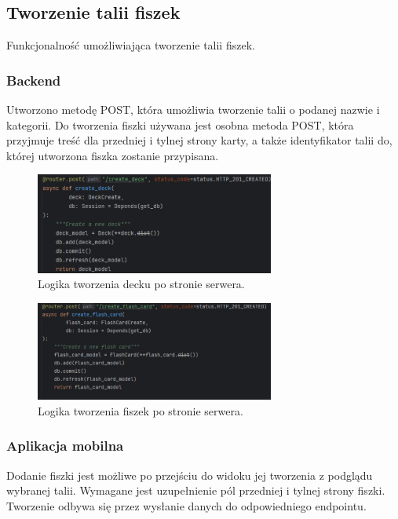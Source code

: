 \subsection{Tworzenie talii fiszek}

Funkcjonalność umożliwiająca tworzenie talii fiszek.

\subsubsection{Backend}

Utworzono metodę POST, która umożliwia tworzenie talii o podanej nazwie i kategorii. Do tworzenia fiszki używana jest osobna metoda POST, która przyjmuje treść dla przedniej i tylnej strony karty, a także identyfikator talii do, której utworzona fiszka zostanie przypisana.

\begin{figure}[H]
    \centering
    \includegraphics[width=0.7\textwidth]{chapters/chapter_8/screens/create_deck_backend}
    \caption{Logika tworzenia decku po stronie serwera.}
    \label{img:create_deck_backend}
\end{figure}

\begin{figure}[H]
    \centering
    \includegraphics[width=0.7\textwidth]{chapters/chapter_8/screens/create_flash_card_backend}
    \caption{Logika tworzenia fiszek po stronie serwera.}
    \label{img:create_flash_card_backend}
\end{figure}

\subsubsection{Aplikacja mobilna}
Dodanie fiszki jest możliwe po przejściu do widoku jej tworzenia z podglądu wybranej talii. Wymagane jest uzupełnienie pól przedniej i tylnej strony fiszki. Tworzenie odbywa się przez wysłanie danych do odpowiedniego endpointu.

